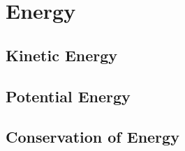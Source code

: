 \section{Energy} \label{sec:Energy}

\subsection{Kinetic Energy} \label{subsec:Kinetic Energy}

\subsection{Potential Energy} \label{subsec:Potential Energy}

\subsection{Conservation of Energy} \label{subsec:Conservation of Energy}